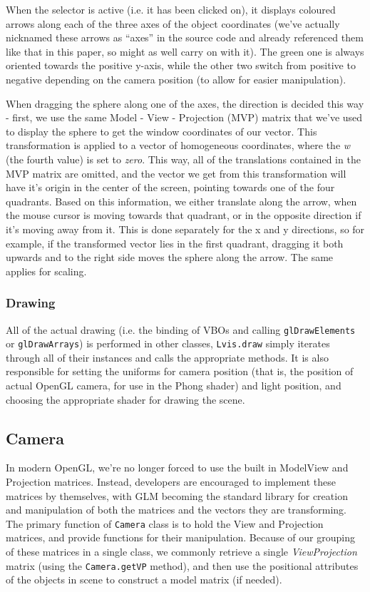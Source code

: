When the selector is active (i.e. it has been clicked on), it displays coloured arrows along each of the three axes of the object coordinates (we've actually nicknamed these arrows as ``axes'' in the source code and already referenced them like that in this paper, so might as well carry on with it). The green one is always oriented towards the positive y-axis, while the other two switch from positive to negative depending on the camera position (to allow for easier manipulation).

When dragging the sphere along one of the axes, the direction is decided this way - first, we use the same Model - View - Projection (MVP) matrix that we've used to display the sphere to get the window coordinates of our vector. This transformation is applied to a vector of homogeneous coordinates, where the \emph{w} (the fourth value) is set to \emph{zero}. This way, all of the translations contained in the MVP matrix are omitted, and the vector we get from this transformation will have it's origin in the center of the screen, pointing towards one of the four quadrants. Based on this information, we either translate along the arrow, when the mouse cursor is moving towards that quadrant, or in the opposite direction if it's moving away from it. This is done separately for the x and y directions, so for example, if the transformed vector lies in the first quadrant, dragging it both upwards and to the right side moves the sphere along the arrow. The same applies for scaling. 

\subsubsection{Drawing}

All of the actual drawing (i.e. the binding of VBOs and calling \texttt{glDrawElements} or \texttt{glDrawArrays}) is performed in other classes, \texttt{Lvis.draw} simply iterates through all of their instances and calls the appropriate methods. It is also responsible for setting the uniforms for camera position (that is, the position of actual OpenGL camera, for use in the Phong shader) and light position, and choosing the appropriate shader for drawing the scene.

\subsection{Camera}

In modern OpenGL, we're no longer forced to use the built in ModelView and Projection matrices. Instead, developers are encouraged to implement these matrices by themselves, with GLM becoming the standard library for creation and manipulation of both the matrices and the vectors they are transforming. The primary function of \texttt{Camera} class is to hold the View and Projection matrices, and provide functions for their manipulation. Because of our grouping of these matrices in a single class, we commonly retrieve a single \emph{ViewProjection} matrix (using the \texttt{Camera.getVP} method), and then use the positional attributes of the objects in scene to construct a model matrix (if needed).

